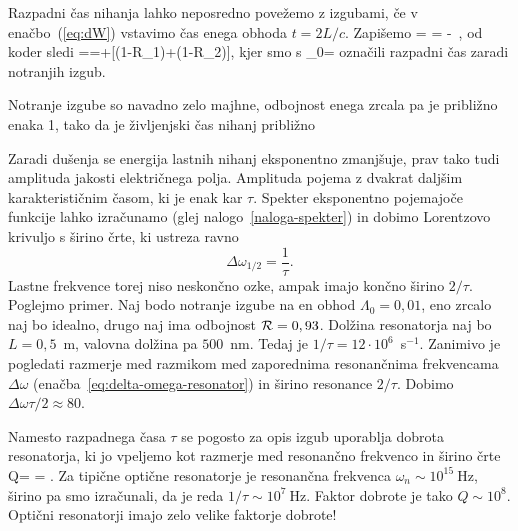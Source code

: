 Razpadni čas nihanja lahko neposredno povežemo z izgubami, če v enačbo~(\ref{eq:dW})
vstavimo čas enega obhoda $t=2L/c$. Zapišemo
\beq
{}= \Lambda = -\, ,
\eeq
od koder sledi
\beq
{}==+[(1-{\cal R}_{1})+(1-{\cal R}_{2})],
\label{taulambda}
\eeq
kjer smo s 
\beq
\tau_{0}=
\eeq
označili razpadni čas zaradi notranjih izgub. 

Notranje izgube so navadno zelo majhne, odbojnost enega zrcala
pa je približno enaka 1, tako da je življenjski čas nihanj približno

Zaradi dušenja se energija lastnih nihanj eksponentno zmanjšuje, prav tako tudi
amplituda jakosti električnega polja. Amplituda pojema z dvakrat daljšim 
karakterističnim časom, ki je enak kar $\tau$. Spekter eksponentno pojemajoče funkcije lahko izračunamo
(glej nalogo~\ref{naloga-spekter}) in dobimo Lorentzovo krivuljo 
s širino črte, ki ustreza ravno
\begin{equation}
\Delta\omega_{1/2}=\frac{1}{\tau}.
\label{3.26}
\end{equation}
Lastne frekvence torej niso neskončno ozke, ampak imajo končno širino $2/\tau$.
Poglejmo primer. Naj bodo notranje izgube na en obhod $\Lambda_0=0,01$,
eno zrcalo naj bo idealno, drugo naj ima odbojnost ${\cal R}=0,93$. Dolžina
resonatorja naj bo $L=0,5$~m, valovna dolžina pa $500$~nm. Tedaj
je $1/\tau=12\cdot10^{6}$~s$^{-1}$. Zanimivo je pogledati razmerje med 
razmikom med zaporednima resonančnima frekvencama $\Delta \omega$ 
(enačba~\ref{eq:delta-omega-resonator}) in širino resonance $2/\tau$. 
Dobimo $\Delta\omega\tau/2 \approx 80$.

\begin{remark}
Namesto razpadnega časa $\tau$ se pogosto za opis izgub uporablja
dobrota resonatorja, ki jo vpeljemo kot
razmerje med resonančno frekvenco in širino črte 
\beq
Q= = .
\eeq
Za tipične optične resonatorje je resonančna 
frekvenca $\omega_n \sim 10^{15}~\si{\hertz}$, širino pa smo izračunali, da je reda 
 $1/\tau \sim 10^{7}~\si{\hertz}$. Faktor dobrote je tako $Q \sim 10^{8}$. Optični 
 resonatorji imajo zelo velike faktorje dobrote!
\end{remark}

